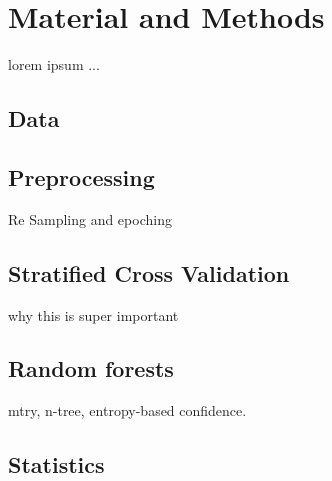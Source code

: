 \section{Material and Methods} \label{matmet}

lorem ipsum ...
\subsection{Data}
\subsection{Preprocessing}
Re Sampling and epoching
\subsection{Stratified Cross Validation}
why this is super important


\subsection{Random forests}
mtry, n-tree, entropy-based confidence.
\subsection{Statistics}
